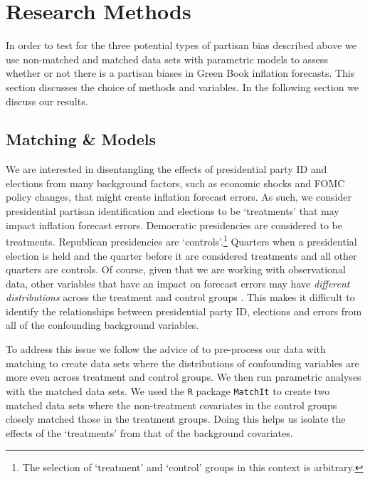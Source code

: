 \documentclass[a4paper]{article}\usepackage{graphicx, color}
\begin{document}

\section{Research Methods}

In order to test for the three potential types of partisan bias described above we use non-matched and matched data sets with parametric models \citep[see][]{Ho2007} to assess whether or not there is a partisan biases in Green Book inflation forecasts. This section discusses the choice of methods and variables. In the following section we discuss our results.

\subsection{Matching \& Models}

We are interested in disentangling the effects of presidential party ID and elections from many background factors, such as economic shocks and FOMC policy changes, that might create inflation forecast errors. As such, we consider presidential partisan identification and elections to be `treatments' that may impact inflation forecast errors. Democratic presidencies are considered to be treatments. Republican presidencies are `controls'.\footnote{The selection of `treatment' and `control' groups in this context is arbitrary.} Quarters when a presidential election is held and the quarter before it are considered treatments and all other quarters are controls. Of course, given that we are working with observational data, other variables that have an impact on forecast errors may have {\emph{different distributions}} across the treatment and control groups \citep{Cochran1973, Diamond2012}. This makes it difficult to identify the relationships between presidential party ID, elections and errors from all of the confounding background variables.

To address this issue we follow the advice of \cite{Ho2007} to pre-process our data with matching to create data sets where the distributions of confounding variables are more even across treatment and control groups. We then run parametric analyses with the matched data sets. We used the {\tt{R}} package {\tt{MatchIt}} \citep{matchit2011} to create two matched data sets where the non-treatment covariates in the control groups closely matched those in the treatment groups. Doing this helps us isolate the effects of the `treatments' from that of the background covariates.
\end{document}
